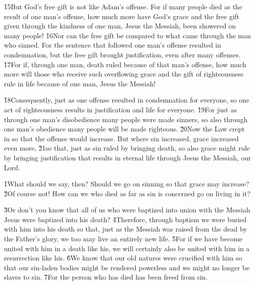 \v{15}But God's free gift is not like Adam's offense. For if many people died as the result of one man's offense, how much more have God's grace and the free gift given through the kindness of one man, Jesus the Messiah, been showered on many people! \v{16}Nor can the free gift be compared to what came through the man who sinned. For the sentence that followed one man's offense resulted in condemnation, but the free gift brought justification, even after many offenses. \v{17}For if, through one man, death ruled because of that man's offense, how much more will those who receive such overflowing grace and the gift of righteousness rule in life because of one man, Jesus the Messiah!

\v{18}Consequently, just as one offense resulted in condemnation for everyone, so one act of righteousness results in justification and life for everyone. \v{19}For just as through one man's disobedience many people were made sinners, so also through one man's obedience many people will be made righteous. \v{20}Now the Law crept in so that the offense would increase. But where sin increased, grace increased even more, \v{21}so that, just as sin ruled by bringing death, so also grace might rule by bringing justification that results in eternal life through Jesus the Messiah, our Lord.

\v{1}What should we say, then? Should we go on sinning so that grace may increase? \v{2}Of course not! How can we who died as far as sin is concerned go on living in it?

\v{3}Or don't you know that all of us who were baptized into union with the Messiah Jesus were baptized into his death? \v{4}Therefore, through baptism we were buried with him into his death so that, just as the Messiah was raised from the dead by the Father's glory, we too may live an entirely new life. \v{5}For if we have become united with him in a death like his, we will certainly also be united with him in a resurrection like his. \v{6}We know that our old natures were crucified with him so that our sin-laden bodies might be rendered powerless and we might no longer be slaves to sin. \v{7}For the person who has died has been freed from sin.

